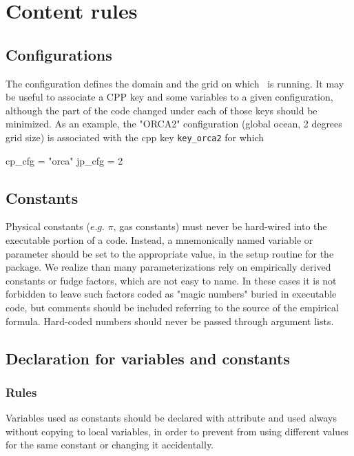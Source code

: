 \section{Content rules}

\subsection{Configurations}

The configuration defines the domain and the grid on which \NEMO\ is running.
It may be useful to associate a CPP key and some variables to a given configuration, although
the part of the code changed under each of those keys should be minimized.
As an example, the "ORCA2" configuration (global ocean, 2 degrees grid size) is associated with
the cpp key \texttt{key\_orca2} for which

\begin{forlines}
cp_cfg = "orca"
jp_cfg = 2
\end{forlines}

\subsection{Constants}

Physical constants ($e.g.$ $\pi$, gas constants) must never be hard-wired into the executable portion of a code.
Instead, a mnemonically named variable or parameter should be set to the appropriate value,
in the setup routine for the package.
We realize than many parameterizations rely on empirically derived constants or fudge factors,
which are not easy to name.
In these cases it is not forbidden to leave such factors coded as "magic numbers" buried in executable code, but
comments should be included referring to the source of the empirical formula.
Hard-coded numbers should never be passed through argument lists.

\subsection{Declaration for variables and constants}

\subsubsection{Rules}

Variables used as constants should be declared with attribute  and
used always without copying to local variables, in order to
prevent from using different values for the same constant or changing it accidentally.

